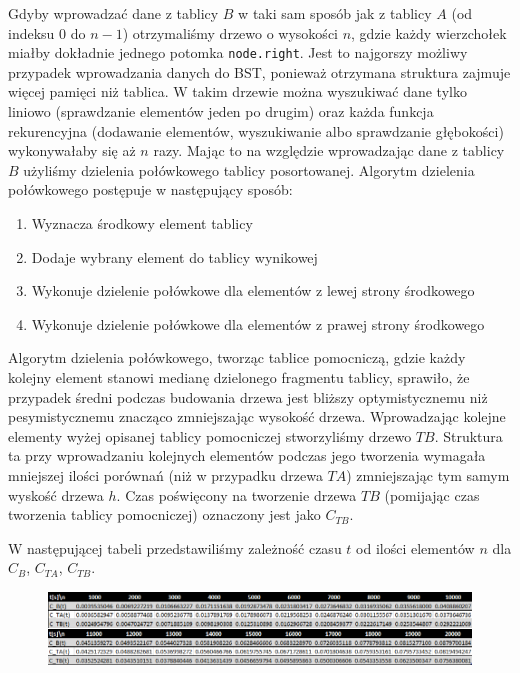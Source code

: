 \documentclass{article}
\begin{document}
Gdyby wprowadzać dane z tablicy $B$ w taki sam sposób jak z tablicy $A$ (od indeksu 0 do $n-1$) otrzymaliśmy drzewo o wysokości $n$, gdzie każdy wierzchołek miałby dokładnie jednego potomka \verb+node.right+. Jest to najgorszy możliwy przypadek wprowadzania danych do BST, ponieważ otrzymana struktura zajmuje więcej pamięci niż tablica. W takim drzewie można wyszukiwać dane tylko liniowo (sprawdzanie elementów jeden po drugim) oraz każda funkcja rekurencyjna (dodawanie elementów, wyszukiwanie albo sprawdzanie głębokości) wykonywałaby się aż $n$ razy. Mając to na względzie wprowadzając dane z tablicy $B$ użyliśmy dzielenia połówkowego tablicy posortowanej. Algorytm dzielenia połówkowego postępuje w następujący sposób:

\begin{enumerate}
	\item Wyznacza środkowy element tablicy
	\item Dodaje wybrany element do tablicy wynikowej
	\item Wykonuje dzielenie połówkowe dla elementów z lewej strony środkowego
	\item Wykonuje dzielenie połówkowe dla elementów z prawej strony środkowego
\end{enumerate}

Algorytm dzielenia połówkowego, tworząc tablice pomocniczą, gdzie każdy kolejny element stanowi medianę dzielonego fragmentu tablicy, sprawiło, że przypadek średni podczas budowania drzewa jest bliższy optymistycznemu niż pesymistycznemu znacząco zmniejszając wysokość drzewa. Wprowadzając kolejne elementy wyżej opisanej tablicy pomocniczej stworzyliśmy drzewo $TB$. Struktura ta przy wprowadzaniu kolejnych elementów podczas jego tworzenia wymagała mniejszej ilości porównań (niż w przypadku drzewa $TA$) zmniejszając tym samym wyskość drzewa $h$. Czas poświęcony na tworzenie drzewa $TB$ (pomijając czas tworzenia tablicy pomocniczej) oznaczony jest jako $C_{TB}$.

W następującej tabeli przedstawiliśmy zależność czasu $t$ od ilości elementów $n$ dla $C_B$, $C_{TA}$, $C_{TB}$.

\begin{figure}[h]
\centering
  \includegraphics[width=1.0\linewidth]{tworzenie_tabela}
  \label{fig:tworzenie_tabela}
\end{figure}%
\end{document}
